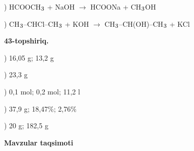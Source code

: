 \documentclass[11pt,a4paper]{article}
\renewcommand{\textsubscript}[1]{\ensuremath{_{\text{\fontsize{8}{8}\selectfont #1}}}}
\begin{document}
) HCOOCH\textsubscript{3} + NaOH $\to$ HCOONa + CH\textsubscript{3}OH\par
{}) CH\textsubscript{3}--CHCl--CH\textsubscript{3} + KOH $\to$ CH\textsubscript{3}--CH(OH)--CH\textsubscript{3} + KCl\par
\noindent\textbf{43-topshiriq.}\par
{}) 16,05 g; 13,2 g\par
{}) 23,3 g\par
{}) 0,1 mol; 0,2 mol; 11,2 l\par
{}) 37,9 g; 18,47\%; 2,76\%\par
{}) 20 g; 182,5 g\par
\par\bigskip\noindent\textbf{Mavzular taqsimoti}\par\smallskip
\end{document}

